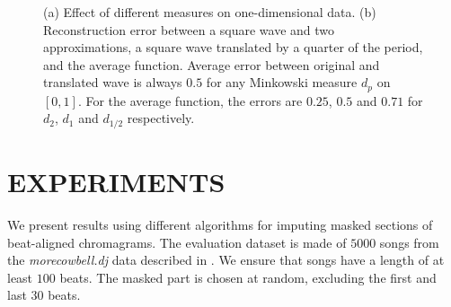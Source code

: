 \documentclass{article}
\begin{document}
\begin{figure}%
\centering
{} 
\hspace{0.1cm}
%
\hspace{8pt}%
\caption{(a) Effect of different measures on one-dimensional data. (b)
  Reconstruction error between a square wave and two approximations, a
  square wave translated by a quarter of the period, and the average
  function. Average error between original and translated wave is
  always $0.5$ for any Minkowski measure $d_p$ on $[0,1]$.  For the
  average function, the errors are $0.25$, $0.5$ and $0.71$ for $d_2$,
  $d_1$ and $d_{1/2}$ respectively.}%
\label{fig:two_measures}
\end{figure}

\section{EXPERIMENTS}
\label{sec:exp}
We present results using different algorithms for imputing masked
sections of beat-aligned chromagrams.  The evaluation dataset is made
of $5000$ songs from the \emph{morecowbell.dj} data described in
\cite{Bertin-Mahieux2010a}.  We ensure that songs have a length of at
least $100$ beats.  The masked part is chosen at random, excluding the
first and last $30$ beats.
\end{document}
